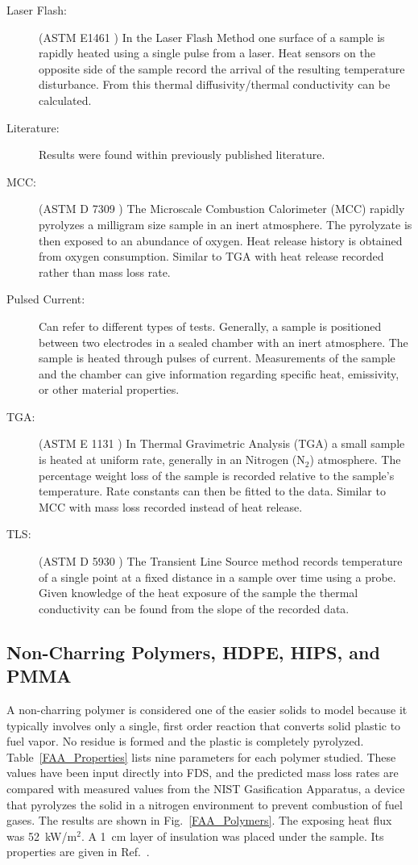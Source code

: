 \begin{description}
\item[Laser Flash:] (ASTM E1461 \cite{laserflash}) In the Laser Flash Method one surface of a sample is rapidly heated using a single pulse from a laser. Heat sensors on the opposite side of the sample record the arrival of the resulting temperature disturbance. From this thermal diffusivity/thermal conductivity can be calculated.
\item[Literature:] Results were found within previously published literature.
\item[MCC:] (ASTM D 7309 \cite{microcc}) The Microscale Combustion Calorimeter (MCC)  rapidly pyrolyzes a milligram size sample in an inert atmosphere. The pyrolyzate is then exposed to an abundance of oxygen.  Heat release history is obtained from oxygen consumption. Similar to TGA with  heat release recorded rather than mass loss rate.
\item[Pulsed Current:] Can refer to different types of tests. Generally, a sample is positioned between two electrodes in a sealed chamber with an inert atmosphere. The sample is heated through pulses of current. Measurements of the sample and the chamber can give information regarding specific heat, emissivity, or other material properties.
\item[TGA:] (ASTM E 1131 \cite{thermalga}) In Thermal Gravimetric Analysis (TGA)  a small sample is heated at uniform rate, generally in an Nitrogen (N$_2$) atmosphere. The percentage weight loss of the sample is recorded relative to the sample's temperature. Rate constants can then be fitted to the data. Similar to MCC with mass loss recorded instead of heat release.
\item[TLS:] (ASTM D 5930 \cite{transline}) The Transient Line Source method records temperature of a single point at a fixed distance in a sample over time using a probe. Given knowledge of the heat exposure of the sample the thermal conductivity can be found from the slope of the recorded data.
\end{description}



\newpage

\subsection{Non-Charring Polymers, HDPE, HIPS, and PMMA}

A non-charring polymer is considered one of the easier solids to model because it typically involves only a single, first order reaction that converts solid plastic to fuel vapor.
No residue is formed and the plastic is completely pyrolyzed. Table~\ref{FAA_Properties}
lists nine parameters for each polymer studied. These values have been input directly into FDS, and the predicted mass loss rates are compared with measured values from the NIST
Gasification Apparatus, a device that pyrolyzes the solid in a nitrogen environment to prevent combustion of fuel gases. The results are shown in Fig.~\ref{FAA_Polymers}. The exposing
heat flux was 52~kW/m$^2$. A 1~cm layer of insulation was placed under the sample. Its properties are given in Ref.~\cite{Stoliarov:CF2009}.


